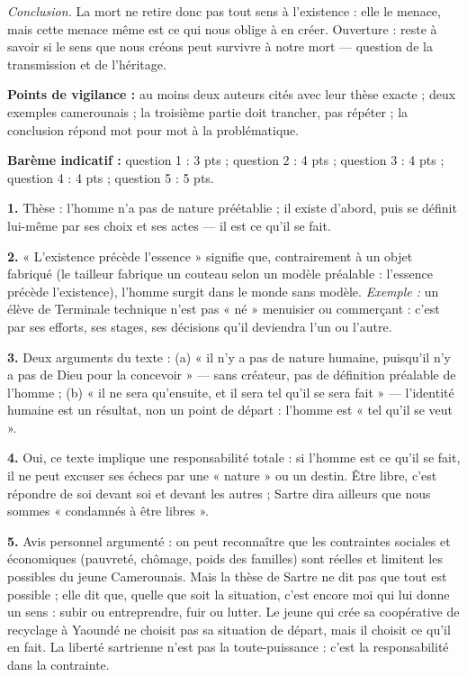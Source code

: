 \documentclass[11pt]{article}
\begin{document}
\begin{corrige}
\emph{Conclusion.} La mort ne retire donc pas tout sens à l'existence : elle le menace, mais cette menace même est ce qui nous oblige à en créer. Ouverture : reste à savoir si le sens que nous créons peut survivre à notre mort — question de la transmission et de l'héritage.

\textbf{Points de vigilance :} au moins deux auteurs cités avec leur thèse exacte ; deux exemples camerounais ; la troisième partie doit trancher, pas répéter ; la conclusion répond mot pour mot à la problématique.
\end{corrige}

\begin{corrige}
\textbf{Barème indicatif :} question 1 : 3 pts ; question 2 : 4 pts ; question 3 : 4 pts ; question 4 : 4 pts ; question 5 : 5 pts.

\textbf{1.} Thèse : l'homme n'a pas de nature préétablie ; il existe d'abord, puis se définit lui-même par ses choix et ses actes — il est ce qu'il se fait.

\textbf{2.} « L'existence précède l'essence » signifie que, contrairement à un objet fabriqué (le tailleur fabrique un couteau selon un modèle préalable : l'essence précède l'existence), l'homme surgit dans le monde sans modèle. \emph{Exemple :} un élève de Terminale technique n'est pas « né » menuisier ou commerçant : c'est par ses efforts, ses stages, ses décisions qu'il deviendra l'un ou l'autre.

\textbf{3.} Deux arguments du texte : (a) « il n'y a pas de nature humaine, puisqu'il n'y a pas de Dieu pour la concevoir » — sans créateur, pas de définition préalable de l'homme ; (b) « il ne sera qu'ensuite, et il sera tel qu'il se sera fait » — l'identité humaine est un résultat, non un point de départ : l'homme est « tel qu'il se veut ».

\textbf{4.} Oui, ce texte implique une responsabilité totale : si l'homme est ce qu'il se fait, il ne peut excuser ses échecs par une « nature » ou un destin. Être libre, c'est répondre de soi devant soi et devant les autres ; Sartre dira ailleurs que nous sommes « condamnés à être libres ».

\textbf{5.} Avis personnel argumenté : on peut reconnaître que les contraintes sociales et économiques (pauvreté, chômage, poids des familles) sont réelles et limitent les possibles du jeune Camerounais. Mais la thèse de Sartre ne dit pas que tout est possible ; elle dit que, quelle que soit la situation, c'est encore moi qui lui donne un sens : subir ou entreprendre, fuir ou lutter. Le jeune qui crée sa coopérative de recyclage à Yaoundé ne choisit pas sa situation de départ, mais il choisit ce qu'il en fait. La liberté sartrienne n'est pas la toute-puissance : c'est la responsabilité dans la contrainte.
\end{corrige}
\end{document}
